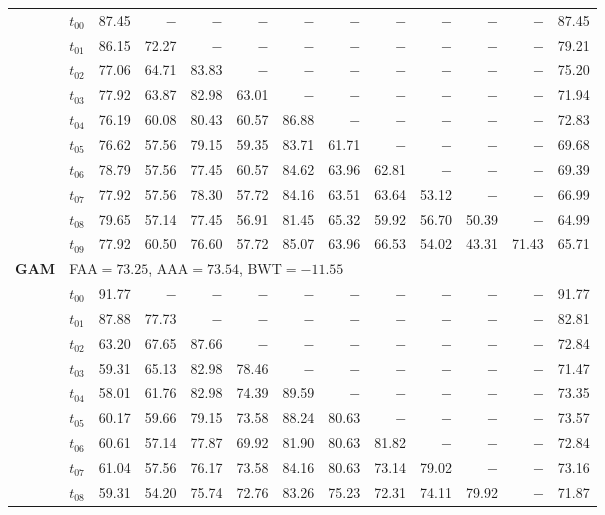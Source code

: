 \begin{table}[ht]
\begin{tabular}{@{}l l r r r r r r r r r r r@{}}
 & $t_{00}$ & 87.45 & $-$ & $-$ & $-$ & $-$ & $-$ & $-$ & $-$ & $-$ & $-$ & 87.45 \\
 & $t_{01}$ & 86.15 & 72.27 & $-$ & $-$ & $-$ & $-$ & $-$ & $-$ & $-$ & $-$ & 79.21 \\
 & $t_{02}$ & 77.06 & 64.71 & 83.83 & $-$ & $-$ & $-$ & $-$ & $-$ & $-$ & $-$ & 75.20 \\
 & $t_{03}$ & 77.92 & 63.87 & 82.98 & 63.01 & $-$ & $-$ & $-$ & $-$ & $-$ & $-$ & 71.94 \\
 & $t_{04}$ & 76.19 & 60.08 & 80.43 & 60.57 & 86.88 & $-$ & $-$ & $-$ & $-$ & $-$ & 72.83 \\
 & $t_{05}$ & 76.62 & 57.56 & 79.15 & 59.35 & 83.71 & 61.71 & $-$ & $-$ & $-$ & $-$ & 69.68 \\
 & $t_{06}$ & 78.79 & 57.56 & 77.45 & 60.57 & 84.62 & 63.96 & 62.81 & $-$ & $-$ & $-$ & 69.39 \\
 & $t_{07}$ & 77.92 & 57.56 & 78.30 & 57.72 & 84.16 & 63.51 & 63.64 & 53.12 & $-$ & $-$ & 66.99 \\
 & $t_{08}$ & 79.65 & 57.14 & 77.45 & 56.91 & 81.45 & 65.32 & 59.92 & 56.70 & 50.39 & $-$ & 64.99 \\
 & $t_{09}$ & 77.92 & 60.50 & 76.60 & 57.72 & 85.07 & 63.96 & 66.53 & 54.02 & 43.31 & 71.43 & 65.71 \\
\midrule
\multirow{11}{*}{\textbf{GAM}} & \multicolumn{12}{l}{\quad\small FAA$=73.25$,\; AAA$=73.54$,\; BWT$=-11.55$} \\
 & $t_{00}$ & 91.77 & $-$ & $-$ & $-$ & $-$ & $-$ & $-$ & $-$ & $-$ & $-$ & 91.77 \\
 & $t_{01}$ & 87.88 & 77.73 & $-$ & $-$ & $-$ & $-$ & $-$ & $-$ & $-$ & $-$ & 82.81 \\
 & $t_{02}$ & 63.20 & 67.65 & 87.66 & $-$ & $-$ & $-$ & $-$ & $-$ & $-$ & $-$ & 72.84 \\
 & $t_{03}$ & 59.31 & 65.13 & 82.98 & 78.46 & $-$ & $-$ & $-$ & $-$ & $-$ & $-$ & 71.47 \\
 & $t_{04}$ & 58.01 & 61.76 & 82.98 & 74.39 & 89.59 & $-$ & $-$ & $-$ & $-$ & $-$ & 73.35 \\
 & $t_{05}$ & 60.17 & 59.66 & 79.15 & 73.58 & 88.24 & 80.63 & $-$ & $-$ & $-$ & $-$ & 73.57 \\
 & $t_{06}$ & 60.61 & 57.14 & 77.87 & 69.92 & 81.90 & 80.63 & 81.82 & $-$ & $-$ & $-$ & 72.84 \\
 & $t_{07}$ & 61.04 & 57.56 & 76.17 & 73.58 & 84.16 & 80.63 & 73.14 & 79.02 & $-$ & $-$ & 73.16 \\
 & $t_{08}$ & 59.31 & 54.20 & 75.74 & 72.76 & 83.26 & 75.23 & 72.31 & 74.11 & 79.92 & $-$ & 71.87 \\

\end{tabular}
\end{table}
